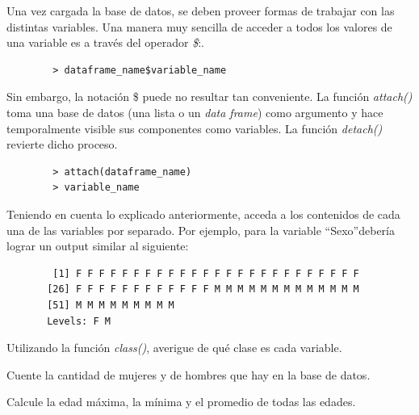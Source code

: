 \documentclass{prob}
\begin{document}
    \begin{problema}
	Una vez cargada la base de datos, se deben proveer formas de trabajar con las distintas variables. Una manera muy sencilla de acceder a todos los valores de una variable es a través del operador \textit{\$}:.
	\begin{verbatim}
	    > dataframe_name$variable_name	
	\end{verbatim}
Sin embargo, la notación \$ puede no resultar tan conveniente. La función \textit{attach()} toma una base de datos (una lista o un  \textit{data frame}) como argumento y hace temporalmente visible sus componentes como variables. La función \textit{detach()} revierte dicho proceso.
	\begin{verbatim}
	    > attach(dataframe_name)
	    > variable_name	
	\end{verbatim}        	

	\begin{parte}
    	Teniendo en cuenta lo explicado anteriormente, acceda a los contenidos de cada una de las variables por separado. Por ejemplo, para la variable \textquotedblleft Sexo\textquotedblright debería lograr un output similar al siguiente:
    	\begin{verbatim}
        [1] F F F F F F F F F F F F F F F F F F F F F F F F F
       [26] F F F F F F F F F F F F M M M M M M M M M M M M M
       [51] M M M M M M M M M
       Levels: F M
    	\end{verbatim}
    \end{parte}

	\begin{parte}
		Utilizando la función \textit{class()}, averigue de qué clase es cada variable.   
    \end{parte}

	\begin{parte}
		Cuente la cantidad de mujeres y de hombres que hay en la base de datos.\\
		
	\noindent{}	
		
    \end{parte}
    
	\begin{parte}
		Calcule la edad máxima, la mínima y el promedio de todas las edades.\\
			
\noindent{}			

    \end{parte}    
    \end{problema}
 
\end{document}
